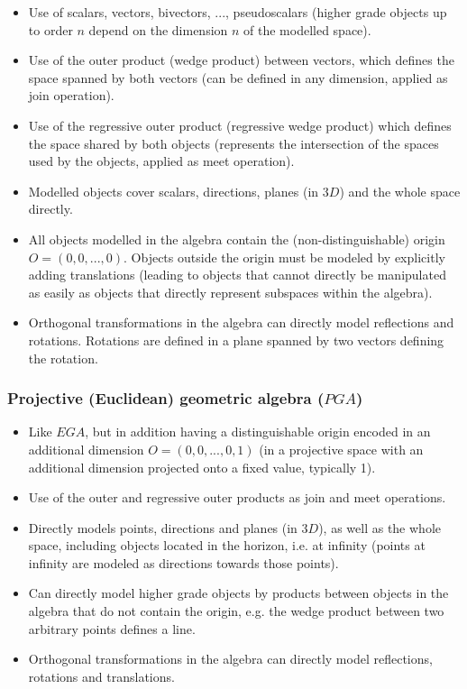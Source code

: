 \begin{itemize}
    \item Use of scalars, vectors, bivectors, ..., pseudoscalars (higher grade objects up
    to order $n$ depend on the dimension $n$ of the modelled space).
    \item Use of the outer product (wedge product) between vectors, which defines the
    space spanned by both vectors (can be defined in any dimension, applied as join
    operation).
    \item Use of the regressive outer product (regressive wedge product) which defines the
    space shared by both objects (represents the intersection of the spaces used by the
    objects, applied as meet operation).
    \item Modelled objects cover scalars, directions, planes (in $3D$) and the whole space
    directly.
    \item All objects modelled in the algebra contain the (non-distinguishable) origin
    $O=(0,0,...,0)$. Objects outside the origin must be modeled by explicitly adding
    translations (leading to objects that cannot directly be manipulated as easily as
    objects that directly represent subspaces within the algebra).
    \item Orthogonal transformations in the algebra can directly model reflections and
    rotations. Rotations are defined in a plane spanned by two vectors defining the
    rotation.
\end{itemize}

\subsubsection{Projective (Euclidean) geometric algebra ($PGA$)}

\begin{itemize}
    \item Like $EGA$, but in addition having a distinguishable origin encoded in an
    additional dimension $O=(0,0,...,0,1)$ (in a projective space with an additional
    dimension projected onto a fixed value, typically 1).
    \item Use of the outer and regressive outer products as join and meet operations.
    \item Directly models points, directions and planes (in $3D$), as well as the whole
    space, including objects located in the horizon, i.e. at infinity (points at
    infinity are modeled as directions towards those points).
    \item Can directly model higher grade objects by products between objects in the
    algebra that do not contain the origin, e.g. the wedge product between two arbitrary
    points defines a line.
    \item Orthogonal transformations in the algebra can directly model reflections,
    rotations and translations.
\end{itemize}

